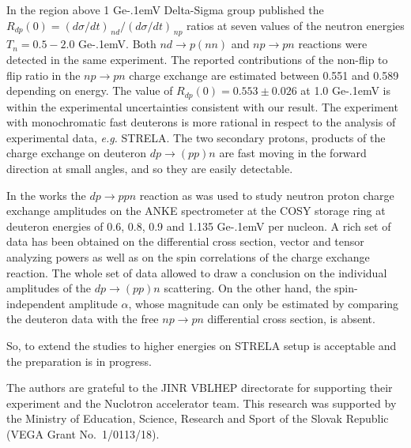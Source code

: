 \documentclass[twocolumn,epjc3]{svjour3}
\newcommand{\np}     {\ensuremath{np \rightarrow pn}\xspace}
\newcommand{\dpfrag} {\ensuremath{dp \rightarrow ppn}\xspace}
\newcommand{\dpchex} {\ensuremath{dp \rightarrow (pp)n}\xspace}
\newcommand{\GeV}    {Ge\kern-.1emV\xspace}
\begin{document}
In the region above 1 \GeV Delta-Sigma group published the
$R_{dp}(0) = (d\sigma/dt)_{\,nd} / (d\sigma/dt)_{\,np}$ ratios
\cite{sha09,sha09_2,shi11} at seven values of the neutron energies
$T_n = 0.5 - 2.0$ \GeV. Both $nd \rightarrow p(nn)$ and \np reactions were
detected in the same experiment. The reported contributions of the non-flip to
flip ratio in the \np charge exchange are estimated between 0.551 and 0.589
depending on energy. The value of $R_{dp}(0) = 0.553 \pm 0.026$ at 1.0 \GeV
\cite{sha09} is within the experimental uncertainties consistent with our
result. The experiment with monochromatic fast deuterons is more rational in
respect to the analysis of experimental data, \textit{e.g.} STRELA. The two
secondary protons, products of the charge exchange on deuteron \dpchex are fast
moving in the forward direction at small angles, and so they are easily
detectable.

In the works \cite{chi09,mch13} the \dpfrag reaction as was used to study
neutron proton charge exchange amplitudes on the ANKE spectrometer at the COSY
storage ring at deuteron energies of 0.6, 0.8, 0.9 and 1.135 \GeV per nucleon.
A rich set of data has been obtained on the differential cross section, vector
and tensor analyzing powers as well as on the spin correlations of the charge
exchange reaction. The whole set of data allowed to draw a conclusion on the
individual amplitudes of the \dpchex scattering. On the other hand, the
spin-independent amplitude $\alpha$, whose magnitude can only be estimated by
comparing the deuteron data with the free \np differential cross section, is
absent.

So, to extend the studies to higher energies on STRELA setup is acceptable
and the preparation is in progress.

\begin{acknowledgements}
  The authors are grateful to the JINR VBLHEP directorate for supporting their
  experiment and the Nuclotron accelerator team. This research was supported by
  the Ministry of Education, Science, Research and Sport of the Slovak Republic
  (VEGA Grant No.~1/0113/18).
\end{acknowledgements}
\end{document}
